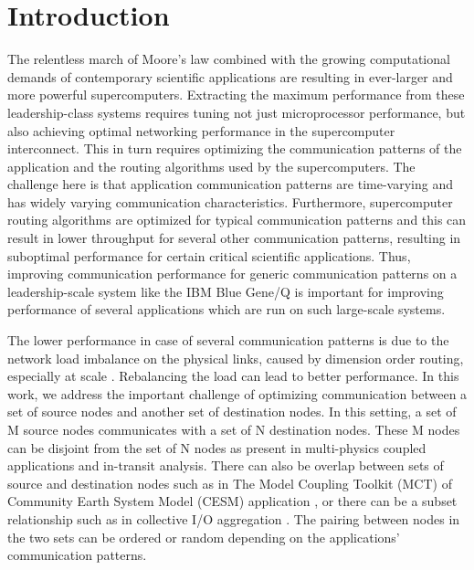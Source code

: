 \section{Introduction}
\label{sec:intro}

The relentless march of Moore's law combined with the growing computational demands of contemporary scientific applications are resulting in ever-larger and more powerful supercomputers. Extracting the maximum performance from these leadership-class systems requires tuning not just microprocessor performance, but also achieving optimal networking performance in the supercomputer interconnect. This in turn requires optimizing the communication patterns of the application and the routing algorithms used by the supercomputers. The challenge here is that application communication patterns are time-varying and has widely varying communication characteristics. Furthermore, supercomputer routing algorithms are optimized for typical communication patterns \cite{Chen:BGQ} and this can result in lower throughput for several other communication patterns, resulting in suboptimal performance for certain critical scientific applications. Thus, improving communication performance for generic communication patterns on a leadership-scale system like the IBM Blue Gene/Q is important for improving performance of several applications which are run on such large-scale systems. 

The lower performance in case of several communication patterns is due to the network load imbalance on the physical links, caused by dimension order routing, especially at scale \cite{npc14}. Rebalancing the load can lead to better performance.  
In this work, we address the important challenge of optimizing communication between a set of source nodes and another set of destination nodes. In this setting, a set of M source nodes communicates with a set of N destination nodes. These M nodes can be disjoint from the set of N nodes as present in multi-physics coupled applications and in-transit analysis. There can also be overlap between sets of source and destination nodes such as in The Model Coupling Toolkit (MCT) of Community Earth System Model (CESM) application \cite{MCT:Jacob}, or there can be a subset relationship such as in collective I/O aggregation \cite{Vishwanath:GLEAN}. The pairing between nodes in the two sets can be ordered or random depending on the applications' communication patterns.

